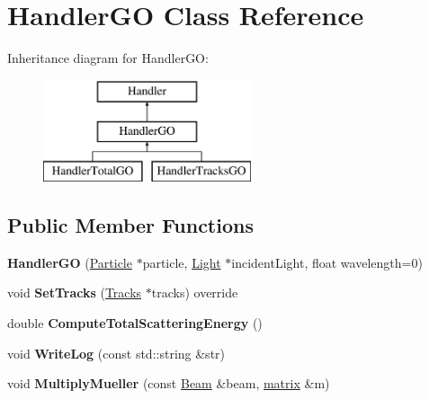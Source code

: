 \hypertarget{class_handler_g_o}{}\section{Handler\+GO Class Reference}
\label{class_handler_g_o}
Inheritance diagram for Handler\+GO\+:\begin{figure}[H]
\begin{center}
\leavevmode
\includegraphics[height=3.000000cm]{class_handler_g_o}
\end{center}
\end{figure}
\subsection*{Public Member Functions}
\begin{DoxyCompactItemize}
\item 
\mbox{\label{class_handler_g_o_a45c45f6377f684d741c59f787948ac13}} 
{\bfseries Handler\+GO} (\mbox{\hyperlink{class_particle}{Particle}} $\ast$particle, \mbox{\hyperlink{class_light}{Light}} $\ast$incident\+Light, float wavelength=0)
\item 
\mbox{\label{class_handler_g_o_a8392befdf6e4cef1d06d7e46b79155f3}} 
void {\bfseries Set\+Tracks} (\mbox{\hyperlink{class_tracks}{Tracks}} $\ast$tracks) override
\item 
\mbox{\label{class_handler_g_o_ad5c3f91af1f7c07be11a9a679804cfa0}} 
double {\bfseries Compute\+Total\+Scattering\+Energy} ()
\item 
\mbox{\label{class_handler_g_o_a5b6812ce2b1f202085f12aeb19eaa663}} 
void {\bfseries Write\+Log} (const std\+::string \&str)
\item 
\mbox{\label{class_handler_g_o_aec3a04f8bb8188f61acd6a3602a603d1}} 
void {\bfseries Multiply\+Mueller} (const \mbox{\hyperlink{class_beam}{Beam}} \&beam, \mbox{\hyperlink{classmatrix}{matrix}} \&m)
\end{DoxyCompactItemize}
